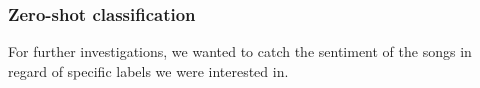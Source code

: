 \subsubsection*{Zero-shot classification}
For further investigations, we wanted to catch the sentiment of the songs in regard of specific labels we were interested in. 